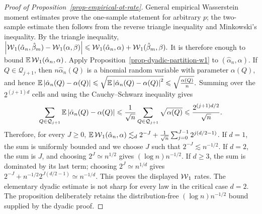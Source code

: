 \begin{proof}[Proof of Proposition~\ref{prop-empirical-ot-rate}]
General empirical Wasserstein moment estimates prove the one-sample statement for arbitrary \(p\); the two-sample estimate then follows from the reverse triangle inequality and Minkowski's inequality.
By the triangle inequality, \(\left\lvert\operatorname{\mathcal{W}}_1(\hat\alpha_n,\hat\beta_m)-\operatorname{\mathcal{W}}_1(\alpha,\beta)\right\rvert \leqslant \operatorname{\mathcal{W}}_1(\hat\alpha_n,\alpha)+\operatorname{\mathcal{W}}_1(\hat\beta_m,\beta).\)
It is therefore enough to bound \(\mathbb{E}\operatorname{\mathcal{W}}_1(\hat\alpha_n,\alpha)\). Apply Proposition~\ref{prop-dyadic-partition-w1} to \((\hat\alpha_n,\alpha)\). If \(Q\in\mathcal Q_{j+1}\), then \(n\hat\alpha_n(Q)\) is a binomial random variable with parameter \(\alpha(Q)\), and hence
\(\mathbb{E}\left\lvert\hat\alpha_n(Q)-\alpha(Q)\right\rvert \leqslant \sqrt{\mathbb{E}\left\lvert\hat\alpha_n(Q)-\alpha(Q)\right\rvert^2} \leqslant \sqrt{\frac{\alpha(Q)}{n}}.\)
Summing over the \(2^{(j+1)d}\) cells and using the Cauchy--Schwarz inequality gives
\[
\sum_{Q\in\mathcal Q_{j+1}}
\mathbb{E}\left\lvert\hat\alpha_n(Q)-\alpha(Q)\right\rvert
\leqslant
\frac{1}{\sqrt n}
\sum_{Q\in\mathcal Q_{j+1}}\sqrt{\alpha(Q)}
\leqslant
\frac{2^{(j+1)d/2}}{\sqrt n}.
\]
Therefore, for every \(J\geq0\),
$\mathbb{E}\operatorname{\mathcal{W}}_1(\hat\alpha_n,\alpha) \lesssim_d 2^{-J} + \frac1{\sqrt n} \sum_{j=0}^{J-1}2^{j(d/2-1)}$.
If \(d=1\), the sum is uniformly bounded and we choose \(J\) such that \(2^{-J}\lesssim n^{-1/2}\). If \(d=2\), the sum is \(J\), and choosing \(2^J\simeq n^{1/2}\) gives \((\log n)n^{-1/2}\). If \(d\geq3\), the sum is dominated by its last term; choosing \(2^J\simeq n^{1/d}\) gives \(2^{-J}+n^{-1/2}2^{J(d/2-1)}\simeq n^{-1/d}\).
This proves the displayed \(\operatorname{\mathcal{W}}_1\) rates. The elementary dyadic estimate is not sharp for every law in the critical case \(d=2\). The proposition deliberately retains the distribution-free \((\log n)n^{-1/2}\) bound supplied by the dyadic proof.
\end{proof}
